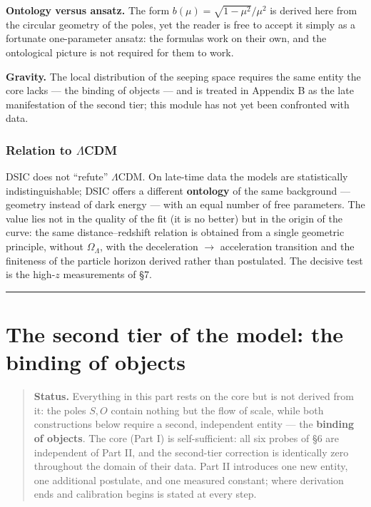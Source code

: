\documentclass{article}
\begin{document}
\medskip
\noindent\textbf{Ontology versus ansatz.} The form $b(\mu) = \sqrt{1-\mu^2}/\mu^2$ is derived here from the circular geometry of the poles, yet the reader is free to accept it simply as a fortunate one-parameter ansatz: the formulas work on their own, and the ontological picture is not required for them to work.

\medskip
\noindent\textbf{Gravity.} The local distribution of the seeping space requires the same entity the core lacks --- the binding of objects --- and is treated in Appendix B as the late manifestation of the second tier; this module has not yet been confronted with data.
\section{Relation to $\Lambda$CDM}

DSIC does not ``refute'' $\Lambda$CDM. On late-time data the models are statistically indistinguishable; DSIC offers a different \textbf{ontology} of the same background --- geometry instead of dark energy --- with an equal number of free parameters. The value lies not in the quality of the fit (it is no better) but in the origin of the curve: the same distance--redshift relation is obtained from a single geometric principle, without $\Omega_\Lambda$, with the deceleration $\to$ acceleration transition and the finiteness of the particle horizon derived rather than postulated. The decisive test is the high-$z$ measurements of \S7.

\bigskip
\hrule
\bigskip

\newpage
\part{The second tier of the model: the binding of objects}

\begin{quote}
\textbf{Status.} Everything in this part rests on the core but is not derived from it: the poles $S, O$ contain nothing but the flow of scale, while both constructions below require a second, independent entity --- the \textbf{binding of objects}. The core (Part I) is self-sufficient: all six probes of \S6 are independent of Part II, and the second-tier correction is identically zero throughout the domain of their data. Part II introduces one new entity, one additional postulate, and one measured constant; where derivation ends and calibration begins is stated at every step.
\end{quote}
\end{document}

